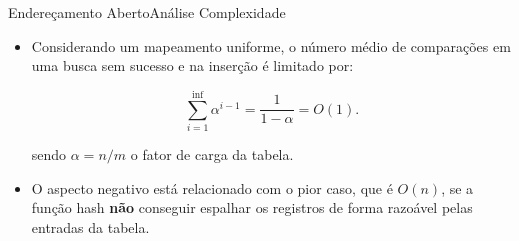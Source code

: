 \documentclass[aspectratio=169]{beamer}
\begin{document}
%



\begin{frame}{Endereçamento Aberto}{Análise}
Complexidade
\begin{itemize}
 \item Considerando um mapeamento uniforme, o número médio de comparações em uma busca sem sucesso e na inserção é limitado por:

\begin{equation}
\sum^{\inf}_{i=1} \alpha^{i-1} = \frac{1}{1 - \alpha} = O(1). \nonumber
\end{equation}

sendo $\alpha = n/m$ o fator de carga da tabela.

\item O aspecto negativo está relacionado com o pior caso, que é $O(n)$, se a função hash {\bf não} conseguir espalhar os registros de forma razoável pelas entradas da tabela.
\end{itemize}
\end{frame}
\end{document}
